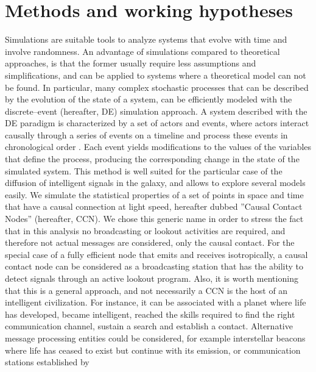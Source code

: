 \documentclass[crop]{CSLB}
\newcommand{\ceti}{CCN}
\begin{document}


\section{Methods and working hypotheses}\label{S_methods}

Simulations are suitable tools to analyze systems that evolve with
time and involve randomness.
%
An advantage of simulations compared to theoretical approaches, is
that the former usually require less assumptions and simplifications,
and can be applied to systems where a theoretical model can not be
found.
%
In particular, many complex stochastic processes that can be described
by the evolution of the state of a system, can be efficiently modeled
with the discrete--event (hereafter, DE) simulation approach.
%
A system described with the DE paradigm is characterized by a set of
actors and events, where actors interact causally through a series of
events on a timeline and process these events in chronological order
\citep{ptolemaeus_system_2014, chung_simulation_2003,
ross_simulation_2012}.
%
Each event yields modifications to the values of the variables that define
the process, producing the corresponding change in the state of the
simulated system.
%
This method is well suited for the particular case of the diffusion of
intelligent signals in the galaxy, and allows to explore several
models easily.
%
We simulate the statistical properties of a set of points in space and
time that have a causal connection at light speed, hereafter dubbed
''Causal Contact Nodes'' (hereafter, \ceti{}).
%
We chose this generic name in order to stress the fact that in this
analysis no broadcasting or lookout activities are required, and
therefore not actual messages are considered, only the causal contact.
%
For the special case of a fully efficient node that emits and receives
isotropically, a causal contact node can be considered as a
broadcasting station that has the ability to detect signals through an
active lookout program.
%
Also, it is worth mentioning that this is a general approach, and not
necessarily a \ceti{} is the host of an intelligent civilization.
%
For instance, it can be associated with a planet where life has developed, became
intelligent, reached the skills required to find the right
communication channel, sustain a search and establish a contact.
%
Alternative message processing entities could be considered, for
example interstellar beacons where life has ceased to exist but
continue with its emission, or communication stations established by
\end{document}
